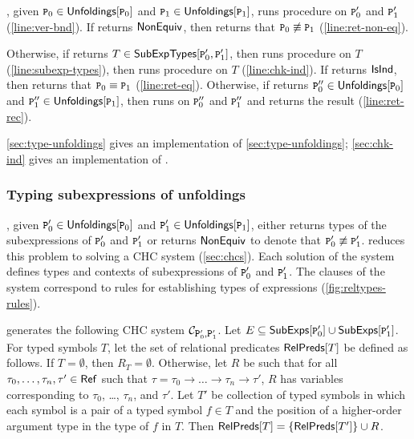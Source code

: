 \verifyaux, given $\cc{P}_0 \in \unfoldings{\cc{P}_0}$ and $\cc{P}_1
\in \unfoldings{ \cc{P}_1 }$, runs procedure \verifybnd on $\cc{P}_0'$
and $\cc{P}_1'$ (\autoref{line:ver-bnd}).
%
If \verifybnd returns $\mathsf{NonEquiv}$, then \verify returns that $\cc{P}_0
\not\equiv \cc{P}_1$ (\autoref{line:ret-non-eq}).

%
Otherwise, if \verifybnd returns $T \in \subexptypes{ \cc{P}_0' }{
  \cc{P}_1' }$,
%
%
then \verify runs procedure \verifyaux on $T$
(\autoref{line:subexp-types}), then \verifybnd runs procedure
\chkinductive on $T$ (\autoref{line:chk-ind}).
%
If \chkinductive returns $\mathsf{IsInd}$, then \verify returns that $\cc{P}_0
\equiv \cc{P}_1$ (\autoref{line:ret-eq}).
Otherwise, if \chkinductive returns $\cc{P}_0'' \in \unfoldings{
  \cc{P}_0 }$ and $\cc{P}_1'' \in \unfoldings{ \cc{P}_1 }$, then
\verifyaux runs \verifyaux on $\cc{P}_0''$ and $\cc{P}_1''$ and
returns the result (\autoref{line:ret-rec}).

\autoref{sec:type-unfoldings} gives an implementation of
\autoref{sec:type-unfoldings};
%
\autoref{sec:chk-ind} gives an implementation of \chkinductive.

\subsubsection{Typing subexpressions of unfoldings}
\label{sec:type-unfoldings}
\verifybnd, given $\cc{P}_0' \in \unfoldings{ \cc{P}_0 }$ and
$\cc{P}_1' \in \unfoldings{ \cc{P}_1 }$, either returns types of the
subexpressions of $\cc{P}_0'$ and $\cc{P}_1'$ or returns $\mathsf{NonEquiv}$
to denote that $\cc{P}_0' \not\equiv \cc{P}_1'$.
%
\verifybnd reduces this problem to solving a CHC system
(\autoref{sec:chcs}).
%
Each solution of the system defines types and contexts of
subexpressions of $\cc{P}_0'$ and $\cc{P}_1'$.
%
The clauses of the system correspond to rules for establishing types
of expressions (\autoref{fig:reltypes-rules}).

%
\verifybnd generates the following CHC system $\mathcal{C}_{
  \cc{P}_0', \cc{P}_1' }$.
Let $E \subseteq \subexps{ \cc{P}_0' } \union \subexps{ \cc{P}_1' }$.
For typed symbols $T$, let the set of relational predicates
$\mathsf{RelPreds}[  T  ]$ be defined as follows.
If $T = \emptyset$, then $R_T = \emptyset$.
Otherwise, let $R$ be such that for all $\tau_0, \ldots, \tau_n, \tau'
\in \mathsf{Ref}$ such that $\tau = \tau_0 \rightarrow \ldots \rightarrow
\tau_n \rightarrow \tau'$, $R$ has variables corresponding to
$\tau_0$, \ldots, $\tau_n$, and $\tau'$.
%
Let $T'$ be collection of typed symbols in which each symbol is a pair
of a typed symbol $f \in T$ and the position of a higher-order
argument type in the type of $f$ in $T$.
%
Then $\mathsf{RelPreds}[  T  ] = \{  \mathsf{RelPreds}[  T'  ]  \} \cup  R $.

